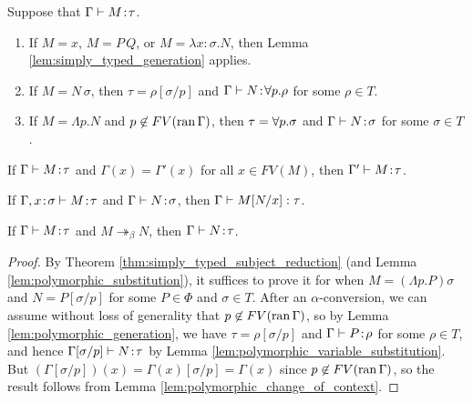 \documentclass[reqno]{amsart}
\begin{document}
    \begin{lemma}\label{lem:polymorphic_generation}
        Suppose that $\Gamma\vdash M\!:\!\tau$.
        \begin{enumerate}
            \item If $M=x$, $M=P\,Q$, or $M=\lambda x\!:\!\sigma.N$, then Lemma \ref{lem:simply_typed_generation} applies.
            \item If $M=N\,\sigma$, then $\tau=\rho[\sigma/p]$ and $\Gamma\vdash N\!:\!\forall p.\rho$ for some $\rho\in T$.
            \item If $M=\Lambda p.N$ and $p\not\in FV(\operatorname{ran}\Gamma)$, then $\tau=\forall p.\sigma$ and $\Gamma\vdash N\!:\!\sigma$ for some $\sigma\in T$.
        \end{enumerate}
    \end{lemma}

    \begin{lemma}\label{lem:polymorphic_change_of_context}
        If $\Gamma\vdash M\!:\!\tau$ and $\Gamma(x)=\Gamma'(x)$ for all $x\in FV(M)$, then $\Gamma'\vdash M\!:\!\tau$.
    \end{lemma}

    \begin{lemma}\label{lem:polymorphic_substitution}
        If $\Gamma,x\!:\!\sigma\vdash M\!:\!\tau$ and $\Gamma\vdash N\!:\!\sigma$, then $\Gamma\vdash M[N/x]:\tau$.
    \end{lemma}

    \begin{theorem}\label{thm:polymorphic_subject_reduction}
        If $\Gamma\vdash M\!:\!\tau$ and $M\twoheadrightarrow_\beta N$, then $\Gamma\vdash N\!:\!\tau$.
    \end{theorem}
    \begin{proof}
        By Theorem \ref{thm:simply_typed_subject_reduction} (and Lemma \ref{lem:polymorphic_substitution}), it suffices to prove it for when $M=(\Lambda p.P)\sigma$ and $N=P[\sigma/p]$ for some $P\in\Phi$ and $\sigma\in T$. After an $\alpha$-conversion, we can assume without loss of generality that $p\not\in FV(\operatorname{ran}\Gamma)$, so by Lemma \ref{lem:polymorphic_generation}, we have $\tau=\rho[\sigma/p]$ and $\Gamma\vdash P\!:\!\rho$ for some $\rho\in T$, and hence $\Gamma[\sigma/p]\vdash N\!:\!\tau$ by Lemma \ref{lem:polymorphic_variable_substitution}. But $(\Gamma[\sigma/p])(x)=\Gamma(x)[\sigma/p]=\Gamma(x)$ since $p\not\in FV(\operatorname{ran}\Gamma)$, so the result follows from Lemma \ref{lem:polymorphic_change_of_context}.
    \end{proof}
\end{document}
